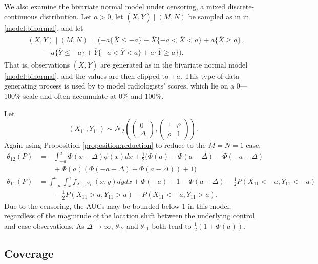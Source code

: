 \documentclass[12pt]{article}
\DeclareMathOperator{\AUC}{AUC}
\newcommand{\cind}{\perp \!\!\! \perp}
\newcommand{\aucindiv}{\theta_{11}}%
\newcommand{\aucpop}{\theta_{12}}%
\newcommand{\bnd}{a}
\begin{document}
We also examine the bivariate normal model under censoring, a mixed
discrete-continuous distribution. Let $\bnd>0$, let
$(\overline X,\overline Y)\mid (M,N)$ be sampled as in in
\eqref{model:binormal}, and let
\begin{gather}
  \begin{aligned}
    \label{model:censored binormal}
  &(X,Y) \mid (M,N) =(-\bnd\{\overline{X}\le-\bnd\}+\overline X\{-\bnd<\overline X <\bnd\} + a\{\overline X\ge a\},\\
  &\qquad
  -\bnd\{\overline{Y}\le-\bnd\}+\overline Y\{-\bnd<\overline Y <\bnd\} + a\{\overline Y\ge a\}).
\end{aligned}
\end{gather}
That is, observations $(\overline X,\overline Y)$ are generated as in the bivariate normal model
\eqref{model:binormal}, and the values are then clipped to $\pm \bnd$.
This type of data-generating process is used by \citep{obuchowski1997} to model
radiologists' scores, which lie on a 0---100\% scale and often
accumulate at $0\%$ and $100\%$.

Let
$$(X_{11},Y_{11})\sim \mathcal{N}_2\left(\begin{pmatrix} 0 \\ \Delta \end{pmatrix},
  \begin{pmatrix} 1 & \rho \\ \rho & 1 \end{pmatrix}
\right).$$
Again using Proposition \ref{proposition:reduction} to reduce to the $M=N=1$ case,
\begin{align}
  \aucpop(P) &=-\int_{-\bnd}^\bnd\Phi(x-\Delta)\phi(x)dx + \frac12(\Phi(\bnd)-\Phi(\bnd-\Delta)-\Phi(-\bnd-\Delta)\\
  &\qquad+\Phi(\bnd)(\Phi(-\bnd-\Delta)+\Phi(\bnd-\Delta))+1)\\
  \aucindiv(P) &=\int_{-\bnd}^\bnd\int_x^\bnd f_{X_{11},Y_{11}}(x,y)dydx + \Phi(-a) + 1 - \Phi(\bnd-\Delta) - \frac12 P(X_{11}<-\bnd,Y_{11}<-\bnd)\\
  &\qquad - \frac12 P(X_{11}>\bnd,Y_{11}>\bnd) - P(X_{11}< -\bnd, Y_{11}>\bnd).
\end{align}
Due to the censoring, the AUCs may be bounded below $1$ in this
model, regardless of the magnitude of the location shift between the underlying control and
case observations. As $\Delta\to\infty$, $\aucpop$ and $\aucindiv$
both tend to $\frac12(1+\Phi(\bnd))$.


\subsection{Coverage}\label{section:simulation:coverage}
\end{document}
